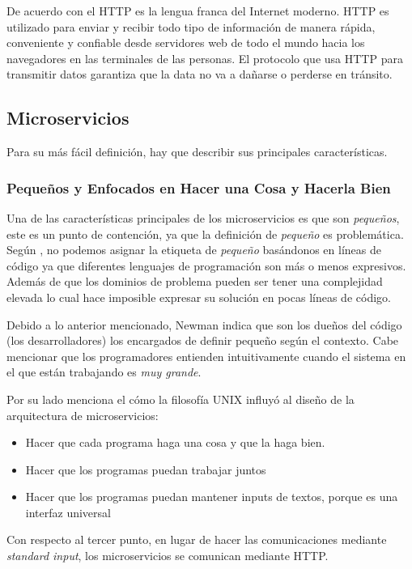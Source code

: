 De acuerdo con \cite{gourley2002http} el HTTP es la lengua franca del Internet moderno.
HTTP es utilizado para enviar y recibir todo tipo de información de manera rápida, conveniente y confiable
desde servidores web de todo el mundo hacia los navegadores en las terminales de las personas.
El protocolo que usa HTTP para transmitir datos garantiza que la data no va a dañarse o perderse en
tránsito.


\subsection{Microservicios}

Para su más fácil definición, hay que describir sus principales características.


\subsubsection{Pequeños y Enfocados en Hacer una Cosa y Hacerla Bien}

Una de las características principales de los microservicios es que son {\it pequeños}, este es un
punto de contención, ya que la definición de {\it pequeño} es problemática.
Según \cite{newman2021building}, no podemos asignar la etiqueta de {\it pequeño} basándonos en líneas
de código ya que diferentes lenguajes de programación son más o menos expresivos.
Además de que los dominios de problema pueden ser tener una complejidad elevada lo cual hace imposible
expresar su solución en pocas líneas de código.

Debido a lo anterior mencionado, Newman indica que son los dueños del código (los desarrolladores)
los encargados de definir {pequeño} según el contexto.
Cabe mencionar que los programadores entienden intuitivamente cuando el sistema en el que están trabajando
es {\it muy grande}.

Por su lado \cite{kleppmann2015kafka} menciona el cómo la filosofía UNIX influyó al diseño de la arquitectura
de microservicios:
\begin{itemize}
  \item Hacer que cada programa haga una cosa y que la haga bien.
  \item Hacer que los programas puedan trabajar juntos
  \item Hacer que los programas puedan mantener inputs de textos, porque es una interfaz universal
\end{itemize}

Con respecto al tercer punto, en lugar de hacer las comunicaciones mediante {\it standard input},
los microservicios se comunican mediante HTTP.


